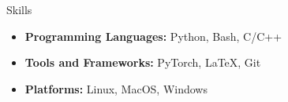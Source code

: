 \documentclass[a4paper]{resume} %
\begin{document}









\begin{rSection}{Skills}

\begin{itemize}
    \item {\bf Programming Languages:} Python, Bash, C/C++
    \item {\bf Tools and Frameworks:} PyTorch, \LaTeX, Git
    \item {\bf Platforms:} Linux, MacOS, Windows
\end{itemize}

\end{rSection}
\end{document}
